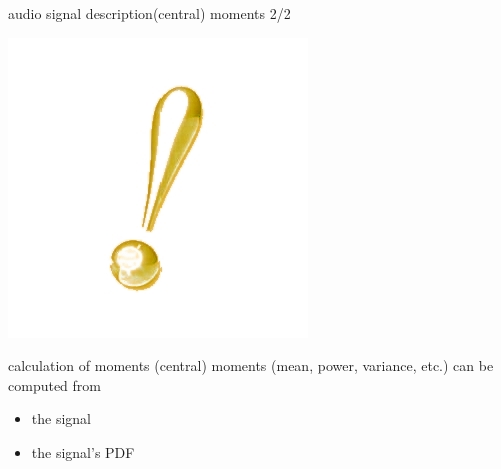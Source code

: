 \begin{frame}{audio signal description}{(central) moments 2/2}
	\vspace{-10mm}
	\begin{flushright}
		 \includegraphics[scale=.25]{Graph/exclamation-mark}
	\end{flushright}
	\begin{block}{calculation of moments}
		\centering
		(central) moments (mean, power, variance, etc.) can be computed from 
		\begin{itemize}
			\item	the signal
			\item	the signal's PDF 
		\end{itemize}		
	\end{block}
\end{frame}		

